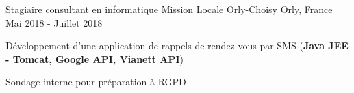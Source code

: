 \begin{cventries}
  \cventry
    {Stagiaire consultant en informatique} %
    {Mission Locale Orly-Choisy} %
    {Orly, France} %
    {Mai 2018 - Juillet 2018} %
    {
      \begin{cvitems} %
        \item {Développement d'une application de rappels de rendez-vous par SMS (\textbf{Java JEE - Tomcat, Google API, Vianett API})}
        \item {Sondage interne pour préparation à RGPD}
      \end{cvitems}
    }
\end{cventries}
